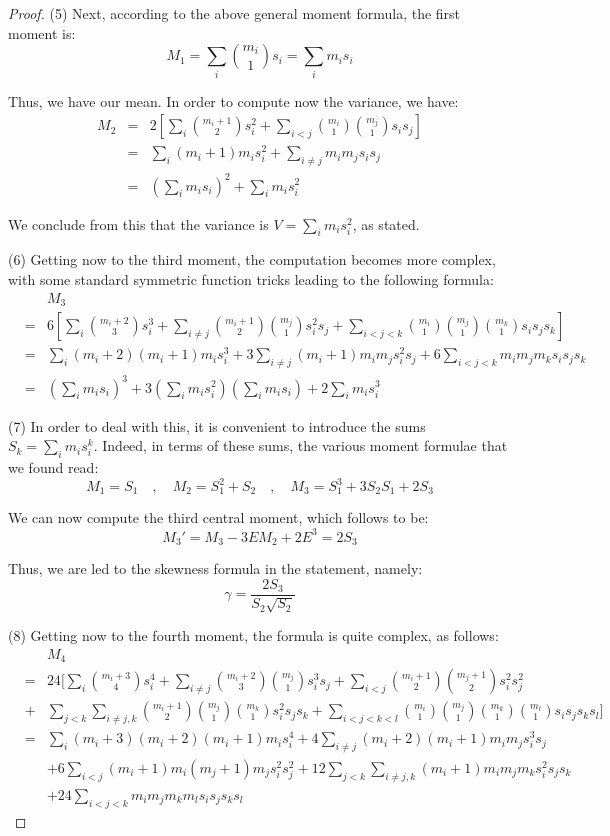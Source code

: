 \documentclass[12pt]{amsbook}
\begin{document}
\begin{proof}
(5) Next, according to the above general moment formula, the first moment is:
$$M_1=\sum_i\binom{m_i}{1}s_i
=\sum_im_is_i$$

Thus, we have our mean. In order to compute now the variance, we have:
\begin{eqnarray*}
M_2
&=&2\left[\sum_i\binom{m_i+1}{2}s_i^2+\sum_{i<j}\binom{m_i}{1}\binom{m_j}{1}s_is_j\right]\\
&=&\sum_i(m_i+1)m_is_i^2+\sum_{i\neq j}m_im_js_is_j\\
&=&\left(\sum_im_is_i\right)^2+\sum_im_is_i^2
\end{eqnarray*}

We conclude from this that the variance is $V=\sum_im_is_i^2$, as stated.

\medskip

(6) Getting now to the third moment, the computation becomes more complex, with some standard symmetric function tricks leading to the following formula:
\begin{eqnarray*}
&&M_3\\
&=&6\left[\sum_i\binom{m_i+2}{3}s_i^3+\sum_{i\neq j}\binom{m_i+1}{2}\binom{m_j}{1}s_i^2s_j+\sum_{i<j<k}\binom{m_i}{1}\binom{m_j}{1}\binom{m_k}{1}s_is_js_k\right]\\
&=&\sum_i(m_i+2)(m_i+1)m_is_i^3+3\sum_{i\neq j}(m_i+1)m_im_js_i^2s_j+6\sum_{i<j<k}m_im_jm_ks_is_js_k\\
&=&\left(\sum_im_is_i\right)^3+3\left(\sum_im_is_i^2\right)\left(\sum_im_is_i\right)+2\sum_im_is_i^3
\end{eqnarray*}

(7) In order to deal with this, it is convenient to introduce the sums $S_k=\sum_im_is_i^k$. Indeed, in terms of these sums, the various moment formulae that we found read:
$$M_1=S_1\quad,\quad M_2=S_1^2+S_2\quad,\quad M_3=S_1^3+3S_2S_1+2S_3$$

We can now compute the third central moment, which follows to be:
$$M_3'=M_3-3EM_2+2E^3=2S_3$$

Thus, we are led to the skewness formula in the statement, namely:
$$\gamma=\frac{2S_3}{S_2\sqrt{S_2}}$$

(8) Getting now to the fourth moment, the formula is quite complex, as follows:
\begin{eqnarray*}
&&M_4\\
&=&24\Big[\sum_i\binom{m_i+3}{4}s_i^4+\sum_{i\neq j}\binom{m_i+2}{3}\binom{m_j}{1}s_i^3s_j+\sum_{i<j}\binom{m_i+1}{2}\binom{m_j+1}{2}s_i^2s_j^2\\
&+&\sum_{j<k}\sum_{i\neq j,k}\binom{m_i+1}{2}\binom{m_j}{1}\binom{m_k}{1}s_i^2s_js_k+\sum_{i<j<k<l}\binom{m_i}{1}\binom{m_j}{1}\binom{m_k}{1}\binom{m_l}{1}s_is_js_ks_l\Big]\\
&=&\sum_i(m_i+3)(m_i+2)(m_i+1)m_is_i^4+4\sum_{i\neq j}(m_i+2)(m_i+1)m_im_js_i^3s_j\\
&&+6\sum_{i<j}(m_i+1)m_i(m_j+1)m_js_i^2s_j^2+12\sum_{j<k}\sum_{i\neq j,k}(m_i+1)m_im_jm_ks_i^2s_js_k\\
&&+24\sum_{i<j<k}m_im_jm_km_ls_is_js_ks_l
\end{eqnarray*}


\end{proof}
\end{document}
